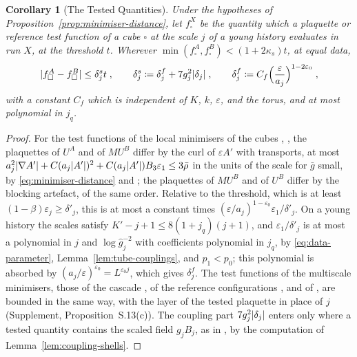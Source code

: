 \documentclass[11pt]{preprint}
\DeclarePairedDelimiter{\abs}{\lvert}{\rvert}
\numberwithin{equation}{section}
\newtheorem{corollary}[theorem]{Corollary}
\theoremstyle{definition}
\theoremstyle{remark}
\theoremstyle{plain}
\begin{document}
\begin{corollary}[The Tested Quantities]\label{cor:tested-quantities}
Under the hypotheses of Proposition~\ref{prop:minimiser-distance}, let $f^X_\square$ be the quantity which a plaquette or reference test function of a cube $\square$ at the scale $j$ of a young history evaluates in run $X$, at the threshold $t$. Wherever $\min(f^A_\square, f^B_\square) < (1 + 2\kappa_s)t$, at equal data,
\begin{equation}\label{eq:tested-quantities}
    \abs{f^A_\square - f^B_\square} \leq \delta^s_jt\;,
    \qquad
    \delta^s_j \coloneqq \delta^f_j + 7g_j^2\abs{\delta_j}\;,
    \qquad
    \delta^f_j \coloneqq C_f\Bigl(\frac{\varepsilon}{a_j}\Bigr)^{1-2\varepsilon_0}\;,
\end{equation}
with a constant $C_f$ which is independent of $K$, $k$, $\varepsilon$, and the torus, and at most polynomial in $j_q$.
\end{corollary}

\begin{proof}
For the test functions of the local minimisers of the cubes \cite[(1.3), (1.4), (1.7), (1.8), p.~178]{BalabanLFR1}, \cite[(2.17), p.~257]{BalabanCRE}, the plaquettes of $U^A$ and of $MU^B$ differ by the curl of $\varepsilon A'$ with transports, at most $a_j^2\abs{\nabla A'} + C(a_j\abs{A'})^2 + C(a_j\abs{A'})B_3\varepsilon_1 \leq 3\bar\rho$ in the units of the scale for $\bar g$ small, by \eqref{eq:minimiser-distance} and \cite[(8)]{BalabanVAR}; the plaquettes of $MU^B$ and of $U^B$ differ by the blocking artefact, of the same order. Relative to the threshold, which is at least $(1 - \beta)\varepsilon_j \geq \delta'_j$, this is at most a constant times $(\varepsilon/a_j)^{1-\varepsilon_0}\varepsilon_1/\delta'_j$. On a young history the scales satisfy $K' - j + 1 \leq 8(1 + j_q)(j + 1)$, and $\varepsilon_1/\delta'_j$ is at most a polynomial in $j$ and $\log\hat g_j^{-2}$ with coefficients polynomial in $j_q$, by \eqref{eq:data-parameter}, Lemma~\ref{lem:tube-couplings}, and $p_1 < p_0$; this polynomial is absorbed by $(a_j/\varepsilon)^{\varepsilon_0} = L^{\varepsilon_0j}$, which gives $\delta^f_j$. The test functions of the multiscale minimisers, those of the cascade \cite[(1.22)--(1.24), p.~181]{BalabanLFR1}, of the reference configurations \cite[(1.27), p.~182]{BalabanLFR1}, and of \cite[(1.75), p.~193]{BalabanLFR1}, are bounded in the same way, with the layer of the tested plaquette in place of $j$ (Supplement, Proposition~S.13(c)). The coupling part $7g_j^2\abs{\delta_j}$ enters only where a tested quantity contains the scaled field $g_jB_j$, as in \cite[(1.27), (1.59)]{BalabanLFR1}, by the computation of Lemma~\ref{lem:coupling-shells}.
\end{proof}
\end{document}
